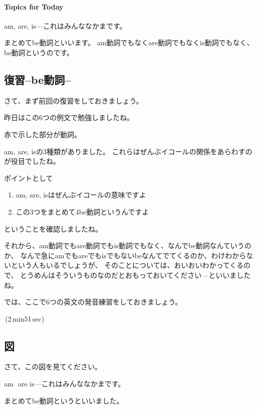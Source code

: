 \documentclass[12pt]{jlreq}
\begin{document}
\paragraph{Topics for Today}
am, are, is---これはみんななかまです。

まとめてbe動詞といいます。
am動詞でもなくare動詞でもなくis動詞でもなく、be動詞というのです。


\subsection{復習--be動詞--}

さて、まず前回の復習をしておきましょう。

昨日はこの6つの例文で勉強しましたね。

赤で示した部分が動詞。

am, are, isの3種類がありました。
これらはぜんぶイコールの関係をあらわすのが役目でしたね。

ポイントとして

\begin{enumerate}
 \item am, are, isはぜんぶイコールの意味ですよ
 \item この3つをまとめて4be動詞というんですよ
\end{enumerate}
ということを確認しましたね。

それから、am動詞でもare動詞でもis動詞でもなく、なんでbe動詞なんていうのか、
なんで急にamでもareでもisでもないbeなんてでてくるのか、わけわからないという人もいるでしょうが、
そのことについては、おいおいわかってくるので、
とうめんはそういうものなのだとおもっておいてください---といいましたね。



では、ここで6つの英文の発音練習をしておきましょう。

\faVolumeUp\,(2\,min51\,sec)

{\large \ComputerMouse}
\subsection{図}
さて、この図を見てください。

am\,\,\ComputerMouse\,\,are\,\,is---これはみんななかまです。

まとめてbe動詞というといいました。
\end{document}
